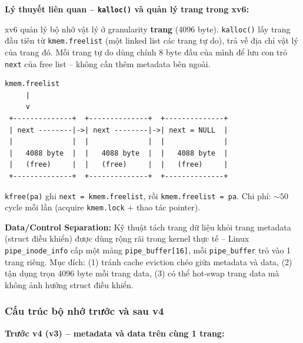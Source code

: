 \documentclass[11pt,a4paper]{article}
\begin{document}
\begin{callout}
\textbf{Lý thuyết liên quan -- \texttt{kalloc()} và quản lý trang trong xv6:}

xv6 quản lý bộ nhớ vật lý ở granularity \textbf{trang} (4096 byte). \texttt{kalloc()} lấy trang đầu tiên từ \texttt{kmem.freelist} (một linked list các trang tự do), trả về địa chỉ vật lý của trang đó. Mỗi trang tự do dùng chính 8 byte đầu của mình để lưu con trỏ \texttt{next} của free list -- không cần thêm metadata bên ngoài.

\begin{lstlisting}[style=plain]
kmem.freelist
     |
     v
 +--------------+  +--------------+  +--------------+
 | next --------|->| next --------|->| next = NULL  |
 |              |  |              |  |              |
 |   4088 byte  |  |   4088 byte  |  |   4088 byte  |
 |   (free)     |  |   (free)     |  |   (free)     |
 +--------------+  +--------------+  +--------------+
\end{lstlisting}

\texttt{kfree(pa)} ghi \texttt{next = kmem.freelist}, rồi \texttt{kmem.freelist = pa}. Chi phí: $\sim 50$ cycle mỗi lần (acquire \texttt{kmem.lock} + thao tác pointer).

\textbf{Data/Control Separation:} Kỹ thuật tách trang dữ liệu khỏi trang metadata (struct điều khiển) được dùng rộng rãi trong kernel thực tế -- Linux \texttt{pipe\_inode\_info} cấp một mảng \texttt{pipe\_buffer[16]}, mỗi \texttt{pipe\_buffer} trỏ vào 1 trang riêng. Mục đích: (1) tránh cache eviction chéo giữa metadata và data, (2) tận dụng trọn 4096 byte mỗi trang data, (3) có thể hot-swap trang data mà không ảnh hưởng struct điều khiển.
\end{callout}

\subsubsection{Cấu trúc bộ nhớ trước và sau v4}

\textbf{Trước v4 (v3) -- metadata và data trên cùng 1 trang:}
\end{document}
